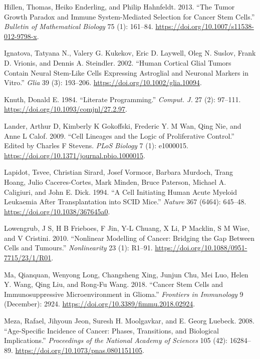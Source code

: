 \documentclass[
  letterpaper,
]{scrreprt}
\newlength{\cslhangindent}
\newenvironment{CSLReferences}[2] %
 {\begin{list}{}{%
  \setlength{\itemindent}{0pt}
  \setlength{\leftmargin}{0pt}
  \setlength{\parsep}{0pt}
  \ifodd #1
   \setlength{\leftmargin}{\cslhangindent}
   \setlength{\itemindent}{-1\cslhangindent}
  \fi
  \setlength{\itemsep}{#2\baselineskip}}}
 {\end{list}}
\theoremstyle{definition}
\theoremstyle{remark}
\begin{document}
\begin{CSLReferences}{1}{0}
Hillen, Thomas, Heiko Enderling, and Philip Hahnfeldt. 2013. {``The
Tumor Growth Paradox and Immune System-Mediated Selection for Cancer
Stem Cells.''} \emph{Bulletin of Mathematical Biology} 75 (1): 161--84.
\url{https://doi.org/10.1007/s11538-012-9798-x}.

Ignatova, Tatyana N., Valery G. Kukekov, Eric D. Laywell, Oleg N.
Suslov, Frank D. Vrionis, and Dennis A. Steindler. 2002. {``Human
Cortical Glial Tumors Contain Neural Stem{-}Like Cells Expressing
Astroglial and Neuronal Markers in Vitro.''} \emph{Glia} 39 (3):
193--206. \url{https://doi.org/10.1002/glia.10094}.

Knuth, Donald E. 1984. {``Literate Programming.''} \emph{Comput. J.} 27
(2): 97--111. \url{https://doi.org/10.1093/comjnl/27.2.97}.

Lander, Arthur D, Kimberly K Gokoffski, Frederic Y. M Wan, Qing Nie, and
Anne L Calof. 2009. {``Cell Lineages and the Logic of Proliferative
Control.''} Edited by Charles F Stevens. \emph{PLoS Biology} 7 (1):
e1000015. \url{https://doi.org/10.1371/journal.pbio.1000015}.

Lapidot, Tsvee, Christian Sirard, Josef Vormoor, Barbara Murdoch, Trang
Hoang, Julio Caceres-Cortes, Mark Minden, Bruce Paterson, Michael A.
Caligiuri, and John E. Dick. 1994. {``A Cell Initiating Human Acute
Myeloid Leukaemia After Transplantation into SCID Mice.''} \emph{Nature}
367 (6464): 645--48. \url{https://doi.org/10.1038/367645a0}.

Lowengrub, J S, H B Frieboes, F Jin, Y-L Chuang, X Li, P Macklin, S M
Wise, and V Cristini. 2010. {``Nonlinear Modelling of Cancer: Bridging
the Gap Between Cells and Tumours.''} \emph{Nonlinearity} 23 (1):
R1--91. \url{https://doi.org/10.1088/0951-7715/23/1/R01}.

Ma, Qianquan, Wenyong Long, Changsheng Xing, Junjun Chu, Mei Luo, Helen
Y. Wang, Qing Liu, and Rong-Fu Wang. 2018. {``Cancer Stem Cells and
Immunosuppressive Microenvironment in Glioma.''} \emph{Frontiers in
Immunology} 9 (December): 2924.
\url{https://doi.org/10.3389/fimmu.2018.02924}.

Meza, Rafael, Jihyoun Jeon, Suresh H. Moolgavkar, and E. Georg Luebeck.
2008. {``Age-Specific Incidence of Cancer: Phases, Transitions, and
Biological Implications.''} \emph{Proceedings of the National Academy of
Sciences} 105 (42): 16284--89.
\url{https://doi.org/10.1073/pnas.0801151105}.


\end{CSLReferences}
\end{document}
